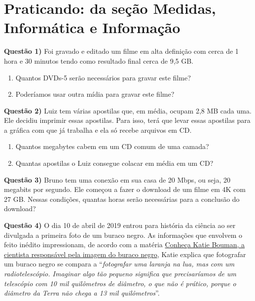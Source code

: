 \section{Praticando: da seção Medidas, Informática e Informação}
\label{\detokenize{NO103-A:praticando-da-secao-medidas-informatica-e-informacao}}
\textbf{Questão 1)} Foi gravado e editado um filme em alta definição com cerca de 1 hora e 30 minutos tendo como resultado final cerca de 9,5 GB.
\begin{enumerate}
\item {} 
Quantos DVDs-5 serão necessários para gravar este filme?

\item {} 
Poderíamos usar outra mídia para gravar este filme?

\end{enumerate}

\textbf{Questão 2)} Luiz tem várias apostilas que, em média, ocupam 2,8 MB cada uma. Ele decidiu imprimir essas apostilas. Para isso, terá que levar essas apostilas para a gráfica com que já trabalha e ela só recebe arquivos em CD.
\begin{enumerate}
\item {} 
Quantos megabytes cabem em um CD comum de uma camada?

\item {} 
Quantas apostilas o Luiz consegue colacar em média em um CD?

\end{enumerate}

\textbf{Questão 3)} Bruno tem uma conexão em sua casa de 20 Mbps, ou seja, 20 megabits por segundo. Ele começou a fazer o download de um filme em 4K com 27 GB. Nessas condições, quantas horas serão necessárias para a conclusão do download?

\textbf{Questão 4)} O dia 10 de abril de 2019 entrou para história da ciência ao ser divulgada a primeira foto de um buraco negro. As informações que envolvem o feito inédito impressionam, de acordo com a matéria \href{https://www1.folha.uol.com.br/ciencia/2019/04/conheca-katie-bouman-a-cientista-responsavel-pela-imagem-do-buraco-negro.shtml}{Conheça Katie Bouman, a cientista responsável pela imagem do buraco negro}, Katie explica que fotografar um buraco negro se compara a  “\textit{fotografar uma laranja na lua, mas com um radiotelescópio. Imaginar algo tão pequeno significa que precisaríamos de um telescópio com 10 mil quilômetros de diâmetro, o que não é prático, porque o diâmetro da Terra não chega a 13 mil quilômetros}”.

